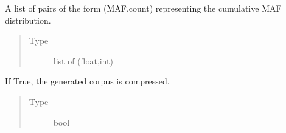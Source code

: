 \documentclass[a4paper,10pt,english]{sphinxhowto}
\begin{document}
\begin{fulllineitems}
\begin{fulllineitems}
\begin{quote}
\begin{description}
\end{description}\end{quote}

\end{fulllineitems}


\begin{fulllineitems}
\label{\detokenize{utils:utils.genotype_corpus_generator.GenotypeCorpusGenerator.cum_mafs}}
A list of pairs of the form (MAF,count) representing the cumulative MAF distribution.
\begin{quote}\begin{description}
\item[{Type}] \leavevmode
list of (float,int)

\end{description}\end{quote}

\end{fulllineitems}


\begin{fulllineitems}
\label{\detokenize{utils:utils.genotype_corpus_generator.GenotypeCorpusGenerator.compress}}
If True, the generated corpus is compressed.
\begin{quote}\begin{description}
\item[{Type}] \leavevmode
bool

\end{description}\end{quote}

\end{fulllineitems}



\end{fulllineitems}
\end{document}
